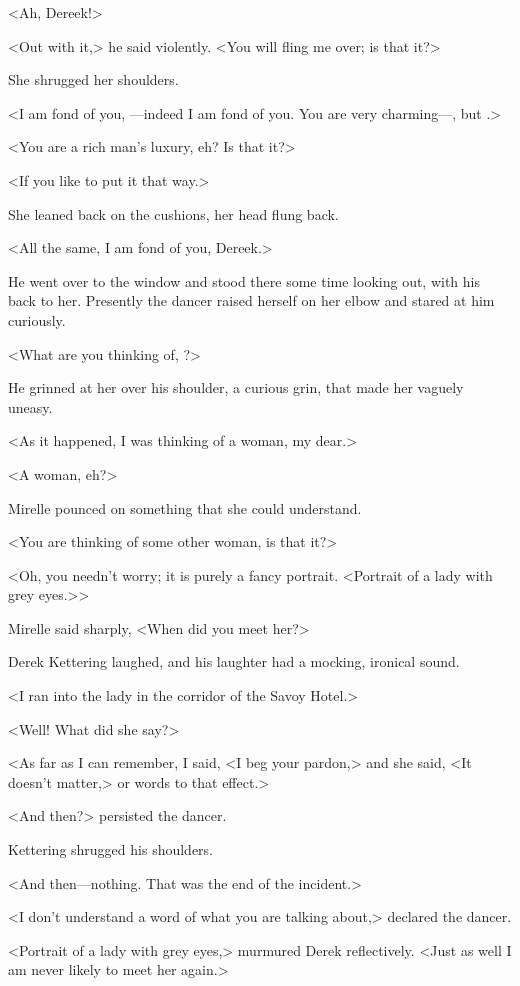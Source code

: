 <Ah, Dereek!>

<Out with it,> he said violently. <You will fling me over; is that it?>

She shrugged her shoulders.

<I am fond of you, —indeed I am fond of you. You are very charming—, but .>

<You are a rich man's luxury, eh? Is that it?>

<If you like to put it that way.>

She leaned back on the cushions, her head flung back.

<All the same, I am fond of you, Dereek.>

He went over to the window and stood there some time looking out, with his back to her. Presently the dancer raised herself on her elbow and stared at him curiously.

<What are you thinking of, ?>

He grinned at her over his shoulder, a curious grin, that made her vaguely uneasy.

<As it happened, I was thinking of a woman, my dear.>

<A woman, eh?>

Mirelle pounced on something that she could understand.

<You are thinking of some other woman, is that it?>

<Oh, you needn't worry; it is purely a fancy portrait. <Portrait of a lady with grey eyes.>>

Mirelle said sharply, <When did you meet her?>

Derek Kettering laughed, and his laughter had a mocking, ironical sound.

<I ran into the lady in the corridor of the Savoy Hotel.>

<Well! What did she say?>

<As far as I can remember, I said, <I beg your pardon,> and she said, <It doesn't matter,> or words to that effect.>

<And then?> persisted the dancer.

Kettering shrugged his shoulders.

<And then—nothing. That was the end of the incident.>

<I don't understand a word of what you are talking about,> declared the dancer.

<Portrait of a lady with grey eyes,> murmured Derek reflectively. <Just as well I am never likely to meet her again.>

